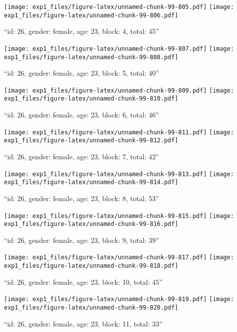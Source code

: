 \documentclass[,]{article}
\begin{document}
\texttt{[image: exp1\_files/figure-latex/unnamed-chunk-99-805.pdf]}
\texttt{[image: exp1\_files/figure-latex/unnamed-chunk-99-806.pdf]}

\newpage
[1] 

``id: 26, gender: female, age: 23, block: 4, total: 45''

\texttt{[image: exp1\_files/figure-latex/unnamed-chunk-99-807.pdf]}
\texttt{[image: exp1\_files/figure-latex/unnamed-chunk-99-808.pdf]}

\newpage
[1] 

``id: 26, gender: female, age: 23, block: 5, total: 40''

\texttt{[image: exp1\_files/figure-latex/unnamed-chunk-99-809.pdf]}
\texttt{[image: exp1\_files/figure-latex/unnamed-chunk-99-810.pdf]}

\newpage
[1] 

``id: 26, gender: female, age: 23, block: 6, total: 46''

\texttt{[image: exp1\_files/figure-latex/unnamed-chunk-99-811.pdf]}
\texttt{[image: exp1\_files/figure-latex/unnamed-chunk-99-812.pdf]}

\newpage
[1] 

``id: 26, gender: female, age: 23, block: 7, total: 42''

\texttt{[image: exp1\_files/figure-latex/unnamed-chunk-99-813.pdf]}
\texttt{[image: exp1\_files/figure-latex/unnamed-chunk-99-814.pdf]}

\newpage
[1] 

``id: 26, gender: female, age: 23, block: 8, total: 53''

\texttt{[image: exp1\_files/figure-latex/unnamed-chunk-99-815.pdf]}
\texttt{[image: exp1\_files/figure-latex/unnamed-chunk-99-816.pdf]}

\newpage
[1] 

``id: 26, gender: female, age: 23, block: 9, total: 39''

\texttt{[image: exp1\_files/figure-latex/unnamed-chunk-99-817.pdf]}
\texttt{[image: exp1\_files/figure-latex/unnamed-chunk-99-818.pdf]}

\newpage
[1] 

``id: 26, gender: female, age: 23, block: 10, total: 45''

\texttt{[image: exp1\_files/figure-latex/unnamed-chunk-99-819.pdf]}
\texttt{[image: exp1\_files/figure-latex/unnamed-chunk-99-820.pdf]}

\newpage
[1] 

``id: 26, gender: female, age: 23, block: 11, total: 33''
\end{document}
